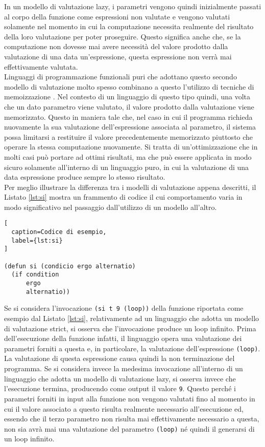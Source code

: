 In un modello di valutazione lazy, i parametri vengono quindi inizialmente
passati al corpo della funzione come espressioni non valutate e vengono valutati
solamente nel momento in cui la computazione necessita realmente del risultato
della loro valutazione per poter proseguire. Questo significa anche che, se la
computazione non dovesse mai avere necessità del valore prodotto dalla
valutazione di una data un'espressione, questa espressione non verrà mai
effettivamente valutata.\\

Linguaggi di programmazione funzionali puri che adottano questo secondo modello
di valutazione molto spesso combinano a questo l'utilizzo di tecniche di
memoizzazione \cite{Geyer-Schulz:1989:MEM:379209.379211}. Nel contesto di un
linguaggio di questo tipo quindi, una volta che un dato parametro viene
valutato, il valore prodotto dalla valutazione viene memorizzato. Questo in
maniera tale che, nel caso in cui il programma richieda nuovamente la sua
valutazione dell'espressione associata al parametro, il sistema possa limitarsi
a restituire il valore precedentemente memorizzato piuttosto che operare la
stessa computazione nuovamente. Si tratta di un'ottimizzazione che in molti casi
può portare ad ottimi risultati, ma che può essere applicata in modo sicuro
solamente all'interno di un linguaggio puro, in cui la valutazione di una data
espressione produce sempre lo stesso risultato.\\

Per meglio illustrare la differenza tra i modelli di valutazione appena
descritti, il Listato \ref{lst:si} mostra un frammento di codice il cui
comportamento varia in modo significativo nel passaggio dall'utilizzo di un
modello all'altro.

\begin{lstlisting}[
  caption=Codice di esempio,
  label={lst:si}
]

(defun si (condicio ergo alternatio)
  (if condition
      ergo
      alternatio))

\end{lstlisting}

Se si considera l'invocazione \texttt{(si t 9 (loop))} della funzione riportata
come esempio dal Listato \ref{lst:si}, relativamente ad un linguaggio che adotta
un modello di valutazione strict, si osserva che l'invocazione produce un loop
infinito. Prima dell'esecuzione della funzione infatti, il linguaggio opera una
valutazione dei parametri forniti a questa e, in particolare, la valutazione
dell'espressione \texttt{(loop)}. La valutazione di questa espressione causa
quindi la non terminazione del programma. Se si considera invece la medesima
invocazione all'interno di un linguaggio che adotta un modello di valutazione
lazy, si osserva invece che l'esecuzione termina, producendo come output il
valore \texttt{9}. Questo perché i parametri forniti in input alla funzione non
vengono valutati fino al momento in cui il valore associato a questo risulta
realmente necessario all'esecuzione ed, essendo che il terzo parametro non
risulta mai effettivamente necessario a questa, non sia avrà mai una valutazione
del parametro \texttt{(loop)} né quindi il generarsi di un loop infinito.\\

